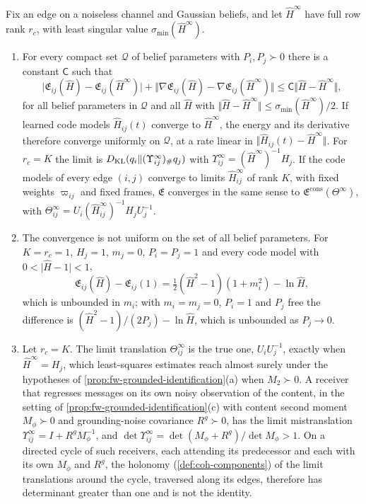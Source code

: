 \begin{proposition}\label{prop:fw-energy-convergence}
Fix an edge on a noiseless channel and Gaussian beliefs, and let $\hat H^\infty$ have full row rank $r_c$, with least singular value $\sigma_{\min}(\hat H^\infty)$.
\begin{enumerate}
\item[(a)] For every compact set $\mathcal Q$ of belief parameters with $P_i,P_j\succ0$ there is a constant $\mathsf C$ such that
\[
\bigl\lvert\mathfrak E_{ij}(\hat H)-\mathfrak E_{ij}(\hat H^\infty)\bigr\rvert+\bigl\Vert\nabla\mathfrak E_{ij}(\hat H)-\nabla\mathfrak E_{ij}(\hat H^\infty)\bigr\Vert\le\mathsf C\Vert\hat H-\hat H^\infty\Vert,
\]
for all belief parameters in $\mathcal Q$ and all $\hat H$ with $\Vert\hat H-\hat H^\infty\Vert\le\sigma_{\min}(\hat H^\infty)/2$. If learned code models $\hat H_{ij}(t)$ converge to $\hat H^\infty$, the energy and its derivative therefore converge uniformly on $\mathcal Q$, at a rate linear in $\Vert\hat H_{ij}(t)-\hat H^\infty\Vert$. For $r_c=K$ the limit is $D_{\mathrm{KL}}(q_i\Vert(\Upsilon^\infty_{ij})_\#q_j)$ with $\Upsilon^\infty_{ij}=(\hat H^\infty)^{-1}H_j$. If the code models of every edge $(i,j)$ converge to limits $\hat H^\infty_{ij}$ of rank $K$, with fixed weights $\varpi_{ij}$ and fixed frames, $\mathfrak E$ converges in the same sense to $\mathfrak E^{\mathrm{cons}}(\Theta^\infty)$, with $\Theta^\infty_{ij}=U_i(\hat H^\infty_{ij})^{-1}H_jU_j^{-1}$.
\item[(b)] The convergence is not uniform on the set of all belief parameters. For $K=r_c=1$, $H_j=1$, $m_j=0$, $P_i=P_j=1$ and every code model with $0<\lvert\hat H-1\rvert<1$,
\[
\mathfrak E_{ij}(\hat H)-\mathfrak E_{ij}(1)=\tfrac12(\hat H^2-1)(1+m_i^2)-\ln\hat H,
\]
which is unbounded in $m_i$; with $m_i=m_j=0$, $P_i=1$ and $P_j$ free the difference is $(\hat H^2-1)/(2P_j)-\ln\hat H$, which is unbounded as $P_j\to0$.
\item[(c)] Let $r_c=K$. The limit translation $\Theta^\infty_{ij}$ is the true one, $U_iU_j^{-1}$, exactly when $\hat H^\infty=H_j$, which least-squares estimates reach almost surely under the hypotheses of \cref{prop:fw-grounded-identification}(a) when $M_2\succ0$. A receiver that regresses messages on its own noisy observation of the content, in the setting of \cref{prop:fw-grounded-identification}(c) with content second moment $M_\phi\succ0$ and grounding-noise covariance $R^g\succ0$, has the limit mistranslation $\Upsilon^\infty_{ij}=I+R^gM_\phi^{-1}$, and $\det\Upsilon^\infty_{ij}=\det(M_\phi+R^g)/\det M_\phi>1$. On a directed cycle of such receivers, each attending its predecessor and each with its own $M_\phi$ and $R^g$, the holonomy (\cref{def:coh-components}) of the limit translations around the cycle, traversed along its edges, therefore has determinant greater than one and is not the identity.
\end{enumerate}
\end{proposition}

